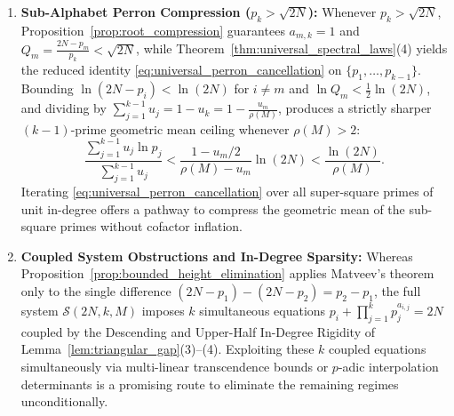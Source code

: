 \documentclass[11pt,a4paper]{article}
\theoremstyle{definition}
\begin{document}
\begin{enumerate}
    \item \textbf{Sub-Alphabet Perron Compression ($p_k > \sqrt{2N}$):}  
    Whenever $p_k > \sqrt{2N}$, Proposition~\ref{prop:root_compression} guarantees $a_{m,k} = 1$ and $Q_m = \frac{2N - p_m}{p_k} < \sqrt{2N}$, while Theorem~\ref{thm:universal_spectral_laws}(4) yields the reduced identity \eqref{eq:universal_perron_cancellation} on $\{p_1, \dots, p_{k-1}\}$. Bounding $\ln(2N - p_i) < \ln(2N)$ for $i \ne m$ and $\ln Q_m < \frac{1}{2}\ln(2N)$, and dividing by $\sum_{j=1}^{k-1} u_j = 1 - u_k = 1 - \frac{u_m}{\rho(M)}$, produces a strictly sharper $(k-1)$-prime geometric mean ceiling whenever $\rho(M) > 2$:
    \begin{equation}
    \label{eq:sub_alphabet_spectral_id}
    \frac{\sum_{j=1}^{k-1} u_j \ln p_j}{\sum_{j=1}^{k-1} u_j} < \frac{1 - u_m/2}{\rho(M) - u_m} \ln(2N) < \frac{\ln(2N)}{\rho(M)}.
    \end{equation}
    Iterating \eqref{eq:universal_perron_cancellation} over all super-square primes of unit in-degree offers a pathway to compress the geometric mean of the sub-square primes without cofactor inflation.

    \item \textbf{Coupled System Obstructions and In-Degree Sparsity:}  
    Whereas Proposition~\ref{prop:bounded_height_elimination} applies Matveev's theorem only to the single difference $(2N - p_1) - (2N - p_2) = p_2 - p_1$, the full system $\mathcal{S}(2N, k, M)$ imposes $k$ simultaneous equations $p_i + \prod_{j=1}^k p_j^{a_{i,j}} = 2N$ coupled by the Descending and Upper-Half In-Degree Rigidity of Lemma~\ref{lem:triangular_gap}(3)--(4). Exploiting these $k$ coupled equations simultaneously via multi-linear transcendence bounds or $p$-adic interpolation determinants \cite{laurent2008} is a promising route to eliminate the remaining regimes unconditionally.
\end{enumerate}
\end{document}
